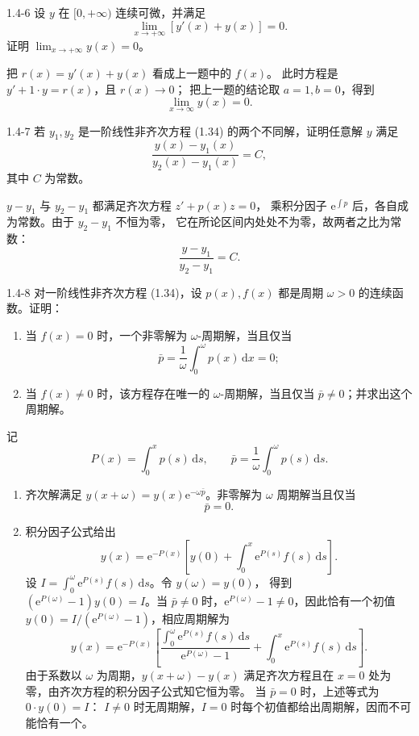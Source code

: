 \documentclass[UTF8,a4paper,11pt]{ctexart}
\newcommand{\dd}{\,\mathrm d}
\newcommand{\e}{\mathrm e}
\begin{document}
\begin{problem}{1.4-6}
设 $y$ 在 $[0,+\infty)$ 连续可微，并满足
  \[
    \lim_{x\to+\infty}[y'(x)+y(x)]=0.
  \]
  证明 $\lim_{x\to+\infty}y(x)=0$。
\end{problem}

\begin{solution}
把 $r(x)=y'(x)+y(x)$ 看成上一题中的 $f(x)$。
此时方程是 $y'+1\cdot y=r(x)$，且 $r(x)\to0$；
把上一题的结论取 $a=1,b=0$，得到
\[
\boxed{\lim_{x\to\infty}y(x)=0}.
\]
\end{solution}

\begin{problem}{1.4-7}
若 $y_1,y_2$ 是一阶线性非齐次方程 (1.34) 的两个不同解，证明任意解 $y$ 满足
  \[
    \frac{y(x)-y_1(x)}{y_2(x)-y_1(x)}=C,
  \]
  其中 $C$ 为常数。
\end{problem}

\begin{solution}
$y-y_1$ 与 $y_2-y_1$ 都满足齐次方程 $z'+p(x)z=0$，
乘积分因子 $\e^{\int p}$ 后，各自成为常数。由于 $y_2-y_1$ 不恒为零，
它在所论区间内处处不为零，故两者之比为常数：
\[
\boxed{\frac{y-y_1}{y_2-y_1}=C}.
\]
\end{solution}

\begin{problem}{1.4-8}
对一阶线性非齐次方程 (1.34)，设 $p(x),f(x)$ 都是周期 $\omega>0$ 的连续函数。证明：
  \begin{enumerate}[label=(\arabic*)]
    \item 当 $f(x)=0$ 时，一个非零解为 $\omega$-周期解，当且仅当
    \[
      \bar p=\frac1\omega\int_0^\omega p(x)\dd x=0;
    \]
    \item 当 $f(x)\ne0$ 时，该方程存在唯一的 $\omega$-周期解，当且仅当 $\bar p\ne0$；并求出这个周期解。
  \end{enumerate}
\end{problem}

\begin{solution}
记
\[
P(x)=\int_0^x p(s)\dd s,\qquad \bar p=\frac1\omega\int_0^\omega p(s)\dd s.
\]
\begin{enumerate}[label=(\arabic*)]
\item 齐次解满足 $y(x+\omega)=y(x)\e^{-\omega\bar p}$。非零解为 $\omega$ 周期解当且仅当
\[
\boxed{\bar p=0}.
\]
\item 积分因子公式给出
\[
y(x)=\e^{-P(x)}\left[y(0)+\int_0^x\e^{P(s)}f(s)\dd s\right].
\]
设 $I=\int_0^\omega\e^{P(s)}f(s)\dd s$。令 $y(\omega)=y(0)$，
得到 $(\e^{P(\omega)}-1)y(0)=I$。当
$\bar p\ne0$ 时，$\e^{P(\omega)}-1\ne0$，因此恰有一个初值
$y(0)=I/(\e^{P(\omega)}-1)$，相应周期解为
\[
\boxed{
y(x)=\e^{-P(x)}\left[
\frac{\displaystyle\int_0^\omega \e^{P(s)}f(s)\dd s}{\e^{P(\omega)}-1}
+\int_0^x\e^{P(s)}f(s)\dd s
\right]}.
\]
由于系数以 $\omega$ 为周期，$y(x+\omega)-y(x)$ 满足齐次方程且在
$x=0$ 处为零，由齐次方程的积分因子公式知它恒为零。
当 $\bar p=0$ 时，上述等式为 $0\cdot y(0)=I$：
$I\ne0$ 时无周期解，$I=0$ 时每个初值都给出周期解，因而不可能恰有一个。
\end{enumerate}
\end{solution}
\end{document}
